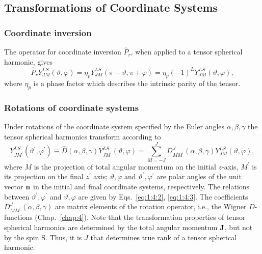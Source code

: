 \subsection{Transformations of Coordinate Systems}\label{sec:7.1.4}
\subsubsection{Coordinate inversion}

The operator for coordinate inversion $\hat{P}_{r}$, when applied to a tensor spherical harmonic, gives
\begin{equation}
\hat{P}_{r} Y_{J M}^{L S}(\vartheta, \varphi)=\eta_{p} Y_{J M}^{L S}(\pi-\vartheta, \pi+\varphi)=\eta_{p}(-1)^{L} Y_{J M}^{L S}(\vartheta, \varphi), \label{eq:7:1:17}
\end{equation}
where $\eta_{p}$ is a phase factor which describes the intrinsic parity of the tensor.

\subsubsection{Rotations of coordinate systems}
Under rotations of the coordinate system specified by the Euler angles $\alpha, \beta, \gamma$ the tensor spherical harmonics transform according to
\begin{equation}
Y_{J M^{\prime}}^{L S}\left(\vartheta^{\prime}, \varphi^{\prime}\right) \equiv \hat{D}(\alpha, \beta, \gamma) Y_{J M^{\prime}}^{L S}(\vartheta, \varphi)=\sum_{M=-J}^{J} D_{M M^{\prime}}^{J}(\alpha, \beta, \gamma) Y_{J M}^{L S}(\vartheta, \varphi), \label{eq:7:1:18}
\end{equation}
where $M$ is the projection of total angular momentum on the initial $z$-axis, $M^{\prime}$ is its projection on the final $z^{\prime}$ axis; $\vartheta, \varphi$ and $\vartheta^{\prime}, \varphi^{\prime}$ are polar angles of the unit vector $\mathbf{n}$ in the initial and final coordinate systems, respectively. The relations between $\vartheta^{\prime}, \varphi^{\prime}$ and $\vartheta, \varphi$ are given by Eqs.~\eqref{eq:1:4:2}, \eqref{eq:1:4:3}. The coefficients $D_{M M^{\prime}}^{J}(\alpha, \beta, \gamma)$ are matrix elements of the rotation operator, i.e., the Wigner $D$-functions (Chap.~\ref{chap:4}). Note that the transformation properties of tensor spherical harmonics are determined by the total angular momentum $\mathbf{J}$, but not by the spin S. Thus, it is $J$ that determines true rank of a tensor spherical harmonic.

